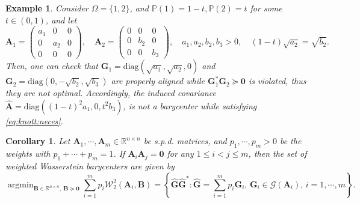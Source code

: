 \documentclass[noinfoline]{imsart}\setcounter{tocdepth}{2}
\renewcommand{\b}[1]{\mathbb{#1}} %
\newcommand{\m}[1]{\mathbf{#1}} %
\renewcommand{\c}[1]{\mathcal{#1}} %
\DeclareMathOperator*{\argmin}{\arg\min}
\theoremstyle{plain}
\newtheorem{corollary}[theorem]{Corollary}
\newtheorem{example}{Example}[section]
\begin{document}
\begin{example}
Consider $\Omega = \{1, 2\}$, and $\b{P}({1}) = 1-t, \b{P}({2}) = t$ for some $t \in (0, 1)$, 
and let 
\begin{equation*}
    \m{A}_{1} = \begin{pmatrix}
    a_{1} & 0 & 0 \\
    0 & a_{2} & 0 \\
    0 & 0 & 0
    \end{pmatrix}, \quad \m{A}_{2} = \begin{pmatrix}
    0 & 0 & 0 \\
    0 & b_{2} & 0 \\
    0 & 0 & b_{3}
    \end{pmatrix}, \quad a_{1}, a_{2}, b_{2}, b_{3} > 0, \quad (1-t) \sqrt{a_{2}} = \sqrt{b_{2}}.
\end{equation*}
Then, one can check that $\m{G}_{1} = \mathrm{diag} (\sqrt{a_{1}}, \sqrt{a_{2}}, 0)$ and $\m{G}_{2} = \mathrm{diag} (0, - \sqrt{b_{2}}, \sqrt{b_{3}})$ are properly aligned while $\m{G}_{1}^{*} \m{G}_{2} \succeq \m{0}$ is violated, thus they are not optimal. Accordingly, the induced covariance $\hat{\m{A}} = \mathrm{diag} ((1-t)^{2} a_{1}, 0, t^{2} b_{3})$, is not a barycenter while satisfying \eqref{eq:knott:neces}.
\end{example}

\begin{corollary}\label{cor:ortho:Green's}
Let $\m{A}_{1}, \cdots, \m{A}_{m}  \in \b{R}^{n \times n}$ be s.p.d. matrices, and $p_{1}, \cdots, p_{m} > 0$ be the weights with $p_{1} + \cdots + p_{m} = 1$. If $\m{A}_{i} \m{A}_{j} = \m{0}$ for any $1 \le i < j \le m$, then the set of weighted Wasserstein barycenters are given by
\begin{equation*}
    \argmin_{\m{B} \in \b{R}^{n \times n}, \ \m{B} \succeq \m{0}}  \sum_{i=1}^{m} p_{i} \c{W}_{2}^{2}(\m{A}_{i}, \m{B}) = \left\{ \hat{\m{G}} \hat{\m{G}}^{*} : \hat{\m{G}} = \sum_{i=1}^{m} p_{i} \m{G}_{i}, \, \m{G}_{i} \in \c{G}(\m{A}_{i}), \, i =1, \cdots, m \right\}.
\end{equation*}
\end{corollary}
\end{document}
